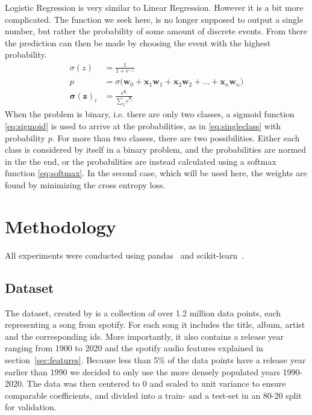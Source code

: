\documentclass{article}
\begin{document}
Logistic Regression is very similar to Linear Regression. However it is a bit more complicated. The function we seek here, is no longer supposed to output a single number, but rather the probability of some amount of discrete events. From there the prediction can then be made by choosing the event with the highest probability.
\begin{align}
  \sigma(z) &= \frac{1}{1+e^{-z}} \label{eq:sigmoid}\\
  p &= \sigma\big(\boldsymbol{w}_0 + \boldsymbol{x}_1\boldsymbol{w}_1+ \boldsymbol{x}_2\boldsymbol{w}_2+ \dots + \boldsymbol{x}_n\boldsymbol{w}_{n}\big) \label{eq:singleclass} \\
  \boldsymbol{\sigma}(\boldsymbol{z})_i &= \frac{e^{\boldsymbol{z}_i}}{\sum_j e^{\boldsymbol{z}_j}} \label{eq:softmax}
\end{align}
When the problem is binary, i.e. there are only two classes, a sigmoid function \eqref{eq:sigmoid} is used to arrive at the probabilities, as in \eqref{eq:singleclass} with probability $p$. For more than two classes, there are two possibilities. Either each class is considered by itself in a binary problem, and the probabilities are normed in the the end, or the probabilities are instead calculated using a softmax function \eqref{eq:softmax}. %
In the second case, which will be used here, the weights are found by minimizing the cross entropy loss. 


\section{Methodology}

All experiments were conducted using pandas~\citep{pandas} and scikit-learn~\citep{sklearn}.
\subsection{Dataset}\label{sec:dataset}

The dataset, created by \citet{dataset} is a collection of over 1.2 million data points, each representing a song from spotify. For each song it includes the title, album, artist and the corresponding ids. More importantly, it also contains a release year ranging from 1900 to 2020 and the spotify audio features explained in section~\ref{sec:features}. Because less than 5\% of the data points have a release year earlier than 1990 we decided to only use the more densely populated years 1990-2020.
The data was then centered to 0 and scaled to unit variance to ensure comparable coefficients, and divided into a train- and a test-set in an 80-20 split for validation.
\end{document}
